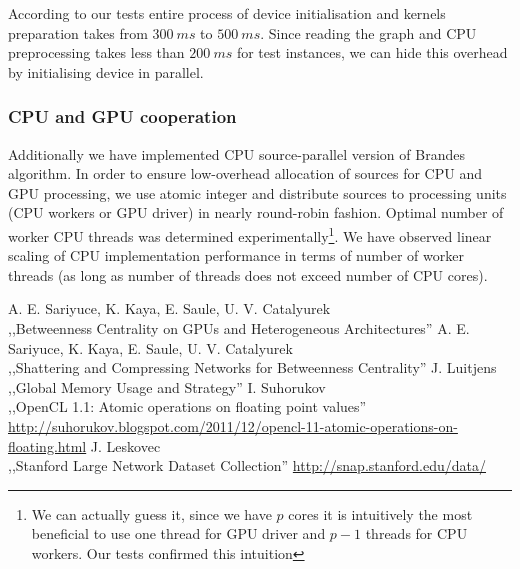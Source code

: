 According to our tests entire process of device initialisation and kernels preparation takes from $\SI{300}{ms}$ to $\SI{500}{ms}$.
Since reading the graph and CPU preprocessing takes less than $\SI{200}{ms}$ for test instances, we can hide this overhead by initialising device in parallel.

\subsubsection*{CPU and GPU cooperation}

Additionally we have implemented CPU source-parallel version of Brandes algorithm.
In order to ensure low-overhead allocation of sources for CPU and GPU processing, we use atomic integer and distribute sources to processing units (CPU workers or GPU driver) in nearly round-robin fashion.
Optimal number of worker CPU threads was determined experimentally\footnote{We can actually guess it, since we have $p$ cores it is intuitively the most beneficial to use one thread for GPU driver and $p - 1$ threads for CPU workers. Our tests confirmed this intuition}.
We have observed linear scaling of CPU implementation performance in terms of number of worker threads (as long as number of threads does not exceed number of CPU cores).


\begin{thebibliography}{9}
   A. E. Sariyuce, K. Kaya, E. Saule, U. V. Catalyurek \\
    \newblock ,,Betweenness Centrality on GPUs and Heterogeneous Architectures''
   A. E. Sariyuce, K. Kaya, E. Saule, U. V. Catalyurek \\
    \newblock ,,Shattering and Compressing Networks for Betweenness Centrality''
   J. Luitjens \\
    \newblock ,,Global Memory Usage and Strategy''
   I. Suhorukov \\
    \newblock ,,OpenCL 1.1: Atomic operations on floating point values'' \\
    \newblock \url{http://suhorukov.blogspot.com/2011/12/opencl-11-atomic-operations-on-floating.html}
   J. Leskovec \\
    \newblock ,,Stanford Large Network Dataset Collection''
    \newblock \url{http://snap.stanford.edu/data/}
\end{thebibliography}


